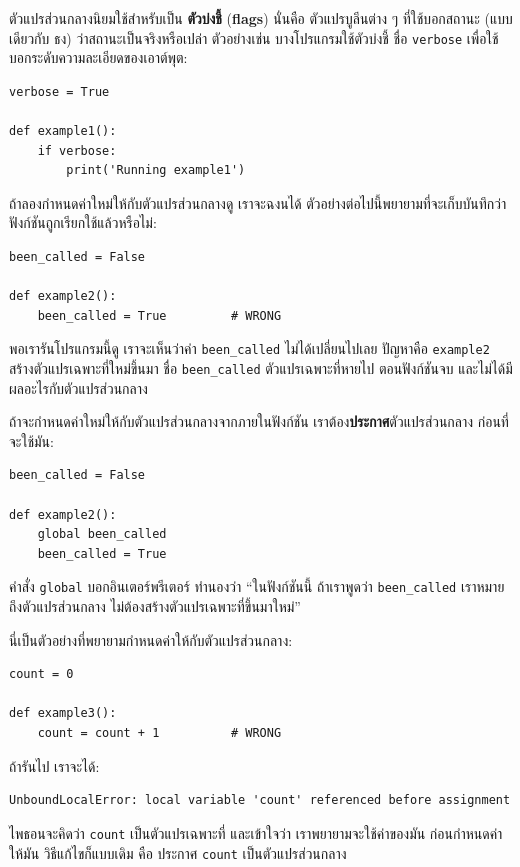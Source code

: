 ตัวแปรส่วนกลางนิยมใช้สำหรับเป็น \textbf{ตัวบ่งชี้} (\textbf{flags})
นั่นคือ ตัวแปรบูลีนต่าง ๆ ที่ใช้บอกสถานะ (แบบเดียวกับ ธง) ว่าสถานะเป็นจริงหรือเปล่า
ตัวอย่างเช่น บางโปรแกรมใช้ตัวบ่งชี้ ชื่อ \texttt{verbose} เพื่อใช้บอกระดับความละเอียดของเอาต์พุต:

\begin{verbatim}
verbose = True

def example1():
    if verbose:
        print('Running example1')
\end{verbatim}
%
ถ้าลองกำหนดค่าใหม่ให้กับตัวแปรส่วนกลางดู
เราจะฉงนได้
ตัวอย่างต่อไปนี้พยายามที่จะเก็บบันทึกว่าฟังก์ชันถูกเรียกใช้แล้วหรือไม่:

\begin{verbatim}
been_called = False

def example2():
    been_called = True         # WRONG
\end{verbatim}
%
พอเรารันโปรแกรมนี้ดู เราจะเห็นว่าค่า \verb"been_called"
ไม่ได้เปลี่ยนไปเลย  
ปัญหาคือ \texttt{example2} สร้างตัวแปรเฉพาะที่ใหม่ขึ้นมา ชื่อ \verb"been_called"  
ตัวแปรเฉพาะที่หายไป ตอนฟังก์ชันจบ
และไม่ได้มีผลอะไรกับตัวแปรส่วนกลาง

ถ้าจะกำหนดค่าใหม่ให้กับตัวแปรส่วนกลางจากภายในฟังก์ชัน
เราต้อง\textbf{ประกาศ}ตัวแปรส่วนกลาง ก่อนที่จะใช้มัน:

\begin{verbatim}
been_called = False

def example2():
    global been_called 
    been_called = True
\end{verbatim}
%
คำสั่ง \texttt{global} บอกอินเตอร์พรีเตอร์ ทำนองว่า
``ในฟังก์ชันนี้ ถ้าเราพูดว่า \verb"been_called"
เราหมายถึงตัวแปรส่วนกลาง ไม่ต้องสร้างตัวแปรเฉพาะที่ขึ้นมาใหม่''

นี่เป็นตัวอย่างที่พยายามกำหนดค่าให้กับตัวแปรส่วนกลาง:

\begin{verbatim}
count = 0

def example3():
    count = count + 1          # WRONG
\end{verbatim}
%
ถ้ารันไป เราจะได้:

\begin{verbatim}
UnboundLocalError: local variable 'count' referenced before assignment
\end{verbatim}
%
ไพธอนจะคิดว่า \texttt{count} เป็นตัวแปรเฉพาะที่
และเข้าใจว่า เราพยายามจะใช้ค่าของมัน ก่อนกำหนดค่าให้มัน
วิธีแก้ไขก็แบบเดิม คือ ประกาศ \texttt{count} เป็นตัวแปรส่วนกลาง

